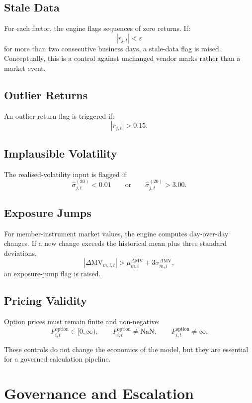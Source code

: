 \documentclass[11pt]{article}
\begin{document}
\subsection{Stale Data}

For each factor, the engine flags sequences of zero returns. If:
\[
|r_{j,t}| < \varepsilon
\]
for more than two consecutive business days, a stale-data flag is raised. Conceptually, this is a control against unchanged vendor marks rather than a market event.

\subsection{Outlier Returns}

An outlier-return flag is triggered if:
\[
|r_{j,t}| > 0.15.
\]

\subsection{Implausible Volatility}

The realised-volatility input is flagged if:
\[
\widehat{\sigma}_{j,t}^{(20)} < 0.01
\qquad \text{or} \qquad
\widehat{\sigma}_{j,t}^{(20)} > 3.00.
\]

\subsection{Exposure Jumps}

For member-instrument market values, the engine computes day-over-day changes. If a new change exceeds the historical mean plus three standard deviations,
\[
|\Delta \text{MV}_{m,i,t}| > \mu_{m,i}^{\Delta \text{MV}} + 3\sigma_{m,i}^{\Delta \text{MV}},
\]
an exposure-jump flag is raised.

\subsection{Pricing Validity}

Option prices must remain finite and non-negative:
\[
P_{i,t}^{\text{option}} \in [0,\infty), \qquad
P_{i,t}^{\text{option}} \neq \text{NaN}, \qquad
P_{i,t}^{\text{option}} \neq \infty.
\]

These controls do not change the economics of the model, but they are essential for a governed calculation pipeline.

\section{Governance and Escalation}
\end{document}
